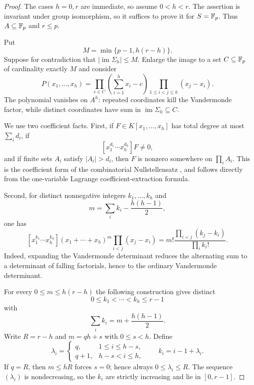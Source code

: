 \begin{proof}
The cases $h=0,r$ are immediate, so assume $0<h<r$.  The assertion is invariant under group isomorphism, so it suffices to prove it for $S=\mathbb F_p$.  Thus $A\subseteq\mathbb F_p$ and $r\le p$.

Put
\[
M=\min\{p-1,h(r-h)\}.
\]
Suppose for contradiction that $|\operatorname{im}\Sigma_h|\le M$.  Enlarge the image to a set $C\subseteq\mathbb F_p$ of cardinality exactly $M$ and consider
\begin{equation}\label{eq:rf-polynomial}
P(x_1,\ldots,x_h)
=
\prod_{c\in C}\left(\sum_{i=1}^h x_i-c\right)
\prod_{1\le i<j\le h}(x_j-x_i).
\end{equation}
The polynomial vanishes on $A^h$: repeated coordinates kill the Vandermonde factor, while distinct coordinates have sum in $\operatorname{im}\Sigma_h\subseteq C$.

We use two coefficient facts.  First, if $F\in K[x_1,\ldots,x_h]$ has total degree at most $\sum_i d_i$, if
\[
[x_1^{d_1}\cdots x_h^{d_h}]F\ne0,
\]
and if finite sets $A_i$ satisfy $|A_i|>d_i$, then $F$ is nonzero somewhere on $\prod_iA_i$.  This is the coefficient form of the combinatorial Nullstellensatz \cite{Alon1999}, and follows directly from the one-variable Lagrange coefficient-extraction formula.

Second, for distinct nonnegative integers $k_1,\ldots,k_h$ and
\[
m=\sum_i k_i-\frac{h(h-1)}2,
\]
one has
\begin{equation}\label{eq:rf-vandermonde}
[x_1^{k_1}\cdots x_h^{k_h}]
(x_1+\cdots+x_h)^m
\prod_{i<j}(x_j-x_i)
=
m!\frac{\prod_{i<j}(k_j-k_i)}{\prod_i k_i!}.
\end{equation}
Indeed, expanding the Vandermonde determinant reduces the alternating sum to a determinant of falling factorials, hence to the ordinary Vandermonde determinant.

For every $0\le m\le h(r-h)$ the following construction gives distinct
\[
0\le k_1<\cdots<k_h\le r-1
\]
with
\begin{equation}\label{eq:rf-exponents}
\sum_i k_i=m+\frac{h(h-1)}2.
\end{equation}
Write $R=r-h$ and $m=qh+s$ with $0\le s<h$.  Define
\[
\lambda_i=
\begin{cases}
q,&1\le i\le h-s,\\
q+1,&h-s<i\le h,
\end{cases}
\qquad
k_i=i-1+\lambda_i.
\]
If $q=R$, then $m\le hR$ forces $s=0$; hence always $0\le\lambda_i\le R$.  The sequence $(\lambda_i)$ is nondecreasing, so the $k_i$ are strictly increasing and lie in $[0,r-1]$.


\end{proof}
